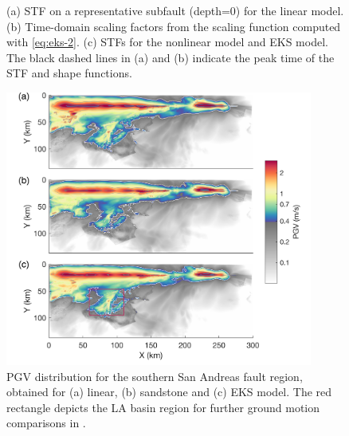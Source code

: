 \clearpage
\begin{figure}[!ht]
     \hfil
     \hfil
    \caption{(a) STF on a representative subfault (depth=0) for the linear model. (b) Time-domain scaling factors from the scaling function computed with \cref{eq:eks-2}. (c) STFs for the nonlinear model and EKS model. The black dashed lines in (a) and (b) indicate the peak time of the STF and shape functions.}
    \label{fig:eks-3}
\end{figure}
\clearpage

\clearpage
\begin{figure}[!ht]
    \includegraphics[width=0.9\textwidth]{figures/figure_eks_4.png}
    \caption{PGV distribution for the southern San Andreas fault region, obtained for (a) linear, (b) sandstone and (c) EKS model. The red rectangle depicts the LA basin region for further ground motion comparisons in .}
    \label{fig:eks-4}
\end{figure}


